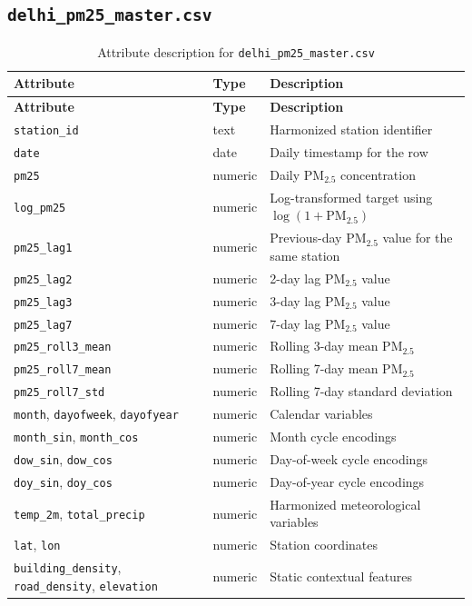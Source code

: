 \documentclass[12pt,a4paper]{report}
\begin{document}
\subsection{\texttt{delhi\_pm25\_master.csv}}
\begin{longtable}{L{3.2cm}L{2cm}L{8.4cm}}
\caption{Attribute description for \texttt{delhi\_pm25\_master.csv}}\\
\toprule
\textbf{Attribute} & \textbf{Type} & \textbf{Description} \\
\midrule
\endfirsthead
\toprule
\textbf{Attribute} & \textbf{Type} & \textbf{Description} \\
\midrule
\endhead
\texttt{station\_id} & text & Harmonized station identifier \\
\texttt{date} & date & Daily timestamp for the row \\
\texttt{pm25} & numeric & Daily PM$_{2.5}$ concentration \\
\texttt{log\_pm25} & numeric & Log-transformed target using $\log(1+\text{PM}_{2.5})$ \\
\texttt{pm25\_lag1} & numeric & Previous-day PM$_{2.5}$ value for the same station \\
\texttt{pm25\_lag2} & numeric & 2-day lag PM$_{2.5}$ value \\
\texttt{pm25\_lag3} & numeric & 3-day lag PM$_{2.5}$ value \\
\texttt{pm25\_lag7} & numeric & 7-day lag PM$_{2.5}$ value \\
\texttt{pm25\_roll3\_mean} & numeric & Rolling 3-day mean PM$_{2.5}$ \\
\texttt{pm25\_roll7\_mean} & numeric & Rolling 7-day mean PM$_{2.5}$ \\
\texttt{pm25\_roll7\_std} & numeric & Rolling 7-day standard deviation \\
\texttt{month}, \texttt{dayofweek}, \texttt{dayofyear} & numeric & Calendar variables \\
\texttt{month\_sin}, \texttt{month\_cos} & numeric & Month cycle encodings \\
\texttt{dow\_sin}, \texttt{dow\_cos} & numeric & Day-of-week cycle encodings \\
\texttt{doy\_sin}, \texttt{doy\_cos} & numeric & Day-of-year cycle encodings \\
\texttt{temp\_2m}, \texttt{total\_precip} & numeric & Harmonized meteorological variables \\
\texttt{lat}, \texttt{lon} & numeric & Station coordinates \\
\texttt{building\_density}, \texttt{road\_density}, \texttt{elevation} & numeric & Static contextual features \\
\bottomrule
\end{longtable}
\end{document}
